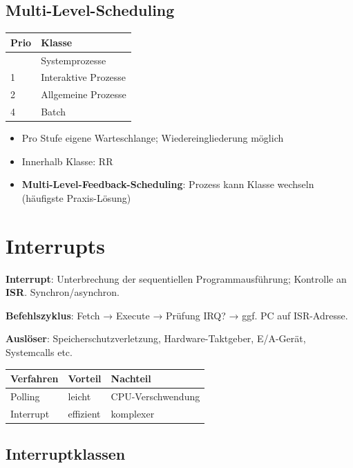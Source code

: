 \documentclass[11pt, a4paper]{article}
\begin{document}
\subsection{Multi-Level-Scheduling}


{\small
\begin{tabularx}{\linewidth}{XX}
\hline
\rowcolor{tableheadbg}
{\color{white}\textbf{Prio}} & {\color{white}\textbf{Klasse}} \\[2pt]
\hline
\endhead
\hline
\endfoot
0 & Systemprozesse \\
1 & Interaktive Prozesse \\
2 & Allgemeine Prozesse \\
4 & Batch \\
\end{tabularx}
}


\begin{itemize}
  \item Pro Stufe eigene Warteschlange; Wiedereingliederung möglich
  \item Innerhalb Klasse: RR
  \item \textbf{Multi-Level-Feedback-Scheduling}: Prozess kann Klasse wechseln (häufigste Praxis-Lösung)
\end{itemize}


\section{Interrupts}

\textbf{Interrupt}: Unterbrechung der sequentiellen Programmausführung; Kontrolle an \textbf{ISR}. Synchron/asynchron.


\textbf{Befehlszyklus}: Fetch → Execute → Prüfung IRQ? → ggf. PC auf ISR-Adresse.


\textbf{Auslöser}: Speicherschutzverletzung, Hardware-Taktgeber, E/A-Gerät, Systemcalls etc.



{\small
\begin{tabularx}{\linewidth}{XXX}
\hline
\rowcolor{tableheadbg}
{\color{white}\textbf{Verfahren}} & {\color{white}\textbf{Vorteil}} & {\color{white}\textbf{Nachteil}} \\[2pt]
\hline
\endhead
\hline
\endfoot
Polling & leicht & CPU-Verschwendung \\
Interrupt & effizient & komplexer \\
\end{tabularx}
}



\subsection{Interruptklassen}
\end{document}
